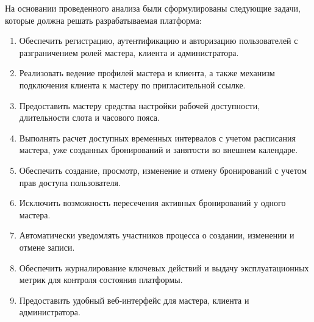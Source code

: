 На основании проведенного анализа были сформулированы следующие задачи, которые должна решать разрабатываемая платформа:
\begin{enumerate}
\item Обеспечить регистрацию, аутентификацию и авторизацию пользователей с разграничением ролей мастера, клиента и администратора.
\item Реализовать ведение профилей мастера и клиента, а также механизм подключения клиента к мастеру по пригласительной ссылке.
\item Предоставить мастеру средства настройки рабочей доступности, длительности слота и часового пояса.
\item Выполнять расчет доступных временных интервалов с учетом расписания мастера, уже созданных бронирований и занятости во внешнем календаре.
\item Обеспечить создание, просмотр, изменение и отмену бронирований с учетом прав доступа пользователя.
\item Исключить возможность пересечения активных бронирований у одного мастера.
\item Автоматически уведомлять участников процесса о создании, изменении и отмене записи.
\item Обеспечить журналирование ключевых действий и выдачу эксплуатационных метрик для контроля состояния платформы.
\item Предоставить удобный веб-интерфейс для мастера, клиента и администратора.
\end{enumerate}
